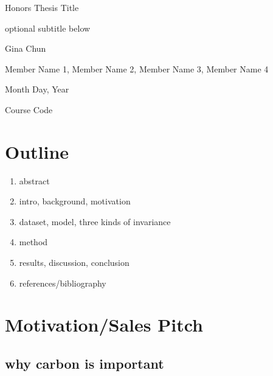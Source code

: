 \documentclass[12pt]{article}
\begin{document}
\begin{titlepage}
   \begin{center}
        \vspace*{5cm}

        \Huge{Honors Thesis Title}

        \vspace{0.5cm}
        \LARGE{optional subtitle below}
            
        \vspace{3 cm}
        \Large{Gina Chun}
       
        \vspace{0.25cm}
        \large{Member Name 1, Member Name 2, Member Name 3, Member Name 4}
       
        \vspace{3 cm}
        \Large{Month Day, Year}
        
        \vspace{0.25 cm}
        \Large{Course Code}
       

       \vfill
    \end{center}
\end{titlepage}

\setcounter{page}{2}
\pagestyle{fancy}
\fancyhf{}
\rhead{\thepage}

\section*{Outline}
\begin{enumerate}
   \item abstract
   \item intro, background, motivation
   \item dataset, model, three kinds of invariance
   \item method
   \item results, discussion, conclusion
   \item references/bibliography
\end{enumerate}

\section*{Motivation/Sales Pitch}
\subsection*{why carbon is important}
\end{document}
